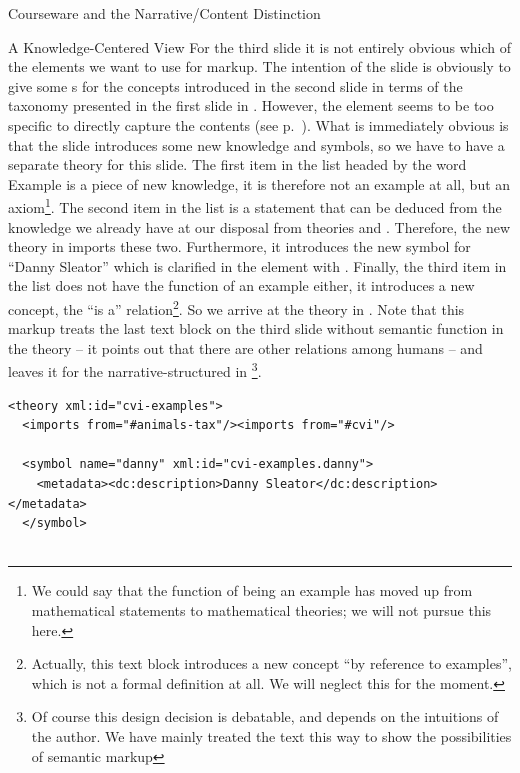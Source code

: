 \begin{tchapter}[id=courseware]{Courseware and the Narrative/Content Distinction}
\begin{tsection}[id=knowledge-centered]{A Knowledge-Centered View}
For the third slide it is not entirely obvious which of the {\omdoc} elements we want to
use for markup. The intention of the slide is obviously to give some {s}
for the concepts introduced in the second slide in terms of the taxonomy presented in the
first slide in {}. However, the {\omdoc} {} element
seems to be too specific to directly capture the contents (see
p.~\pageref{eldef:example}). What is immediately obvious is that the slide introduces some
new knowledge and symbols, so we have to have a separate theory for this slide. The first
item in the list headed by the word Example is a piece of new knowledge, it is therefore
not an example at all, but an axiom\footnote{We could say that the function of being an
  example has moved up from mathematical statements to mathematical theories; we will not
  pursue this here.}. The second item in the list is a statement that can be deduced from
the knowledge we already have at our disposal from theories {}
and {}.  Therefore, the new theory {} in
{} imports these two. Furthermore, it introduces the new symbol
{} for ``Danny Sleator'' which is clarified in the {}
element with {}. Finally, the third item in the list does not have
the function of an example either, it introduces a new concept, the ``is a''
relation{}\footnote{Actually, this
  text block introduces a new concept ``by reference to examples'', which is not a formal
  definition at all. We will neglect this for the moment.}.  So we arrive at the theory in
{}.  Note that this markup treats the last text block on the third
slide without semantic function in the theory -- it points out that there are other
relations among humans -- and leaves it for the narrative-structured {\omdoc} in
{}\footnote{Of course this design decision is debatable,
  and depends on the intuitions of the author.  We have mainly treated the text this way
  to show the possibilities of semantic markup}.

\begin{lstlisting}[label=lst:ann-cvi-ex,
    caption={The {\omdoc} Representation for Slide 3 from {\myfigref{15-211}}},
    index={theory,imports,axiom,symbol,assertion,definition,CMP}]
<theory xml:id="cvi-examples">
  <imports from="#animals-tax"/><imports from="#cvi"/>

  <symbol name="danny" xml:id="cvi-examples.danny">
    <metadata><dc:description>Danny Sleator</dc:description></metadata>
  </symbol>


\end{lstlisting}
\end{tsection}
\end{tchapter}
